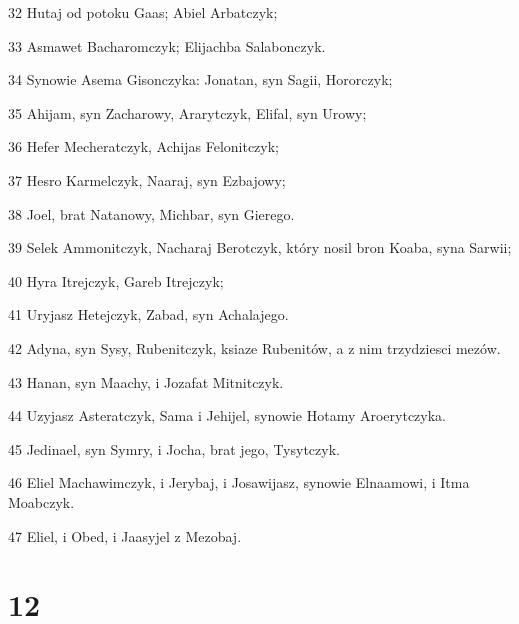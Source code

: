 \par 32 Hutaj od potoku Gaas; Abiel Arbatczyk;
\par 33 Asmawet Bacharomczyk; Elijachba Salabonczyk.
\par 34 Synowie Asema Gisonczyka: Jonatan, syn Sagii, Hororczyk;
\par 35 Ahijam, syn Zacharowy, Ararytczyk, Elifal, syn Urowy;
\par 36 Hefer Mecheratczyk, Achijas Felonitczyk;
\par 37 Hesro Karmelczyk, Naaraj, syn Ezbajowy;
\par 38 Joel, brat Natanowy, Michbar, syn Gierego.
\par 39 Selek Ammonitczyk, Nacharaj Berotczyk, który nosil bron Koaba, syna Sarwii;
\par 40 Hyra Itrejczyk, Gareb Itrejczyk;
\par 41 Uryjasz Hetejczyk, Zabad, syn Achalajego.
\par 42 Adyna, syn Sysy, Rubenitczyk, ksiaze Rubenitów, a z nim trzydziesci mezów.
\par 43 Hanan, syn Maachy, i Jozafat Mitnitczyk.
\par 44 Uzyjasz Asteratczyk, Sama i Jehijel, synowie Hotamy Aroerytczyka.
\par 45 Jedinael, syn Symry, i Jocha, brat jego, Tysytczyk.
\par 46 Eliel Machawimczyk, i Jerybaj, i Josawijasz, synowie Elnaamowi, i Itma Moabczyk.
\par 47 Eliel, i Obed, i Jaasyjel z Mezobaj.

\chapter{12}

